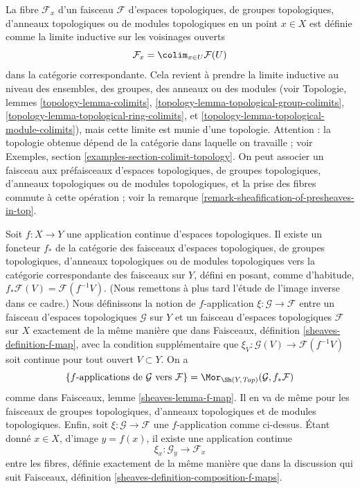 \medskip\noindent
La fibre $\mathcal{F}_x$ d'un faisceau $\mathcal{F}$
d'espaces topologiques, de groupes topologiques, d'anneaux topologiques ou de
modules topologiques en un point $x \in X$ est définie comme la limite inductive sur les
voisinages ouverts
$$
\mathcal{F}_x = \colim_{x\in U} \mathcal{F}(U)
$$
dans la catégorie correspondante. Cela revient à prendre
la limite inductive au niveau des ensembles, des groupes, des anneaux ou des modules
(voir Topologie, lemmes \ref{topology-lemma-colimits},
\ref{topology-lemma-topological-group-colimits},
\ref{topology-lemma-topological-ring-colimits}, et
\ref{topology-lemma-topological-module-colimits}),
mais cette limite est munie d'une topologie. Attention :
la topologie obtenue dépend de la catégorie dans laquelle on travaille ; voir
Exemples, section \ref{examples-section-colimit-topology}.
On peut associer un faisceau aux préfaisceaux d'espaces topologiques,
de groupes topologiques, d'anneaux topologiques ou de modules topologiques,
et la prise des fibres commute à cette opération ; voir
la remarque \ref{remark-sheafification-of-presheaves-in-top}.

\medskip\noindent
Soit $f : X \to Y$ une application continue d'espaces topologiques.
Il existe un foncteur $f_*$ de la catégorie des faisceaux d'espaces
topologiques, de groupes topologiques, d'anneaux topologiques ou de modules topologiques
vers la catégorie correspondante des faisceaux sur $Y$, défini en posant, comme d'habitude,
$f_*\mathcal{F}(V) = \mathcal{F}(f^{-1}V)$.
(Nous remettons à plus tard l'étude de l'image inverse dans ce cadre.)
Nous définissons la notion de $f$-application $\xi : \mathcal{G} \to \mathcal{F}$
entre un faisceau d'espaces topologiques $\mathcal{G}$ sur $Y$ et
un faisceau d'espaces topologiques $\mathcal{F}$ sur $X$ exactement de la
même manière que dans Faisceaux, définition \ref{sheaves-definition-f-map},
avec la condition supplémentaire que
$\xi_V : \mathcal{G}(V) \to \mathcal{F}(f^{-1}V)$ soit continue
pour tout ouvert $V \subset Y$. On a
$$
\{f\text{-applications de }\mathcal{G}\text{ vers }\mathcal{F}\} =
\Mor_{\Sh(Y, \textit{Top})}(\mathcal{G}, f_*\mathcal{F})
$$
comme dans Faisceaux, lemme \ref{sheaves-lemma-f-map}. Il en va de même pour les
faisceaux de groupes topologiques, d'anneaux topologiques et de modules topologiques. Enfin,
soit $\xi : \mathcal{G} \to \mathcal{F}$ une $f$-application comme ci-dessus.
Étant donné $x \in X$, d'image $y = f(x)$, il existe une application
continue
$$
\xi_x : \mathcal{G}_y \longrightarrow \mathcal{F}_x
$$
entre les fibres, définie exactement de la même manière que dans la discussion
qui suit Faisceaux, définition \ref{sheaves-definition-composition-f-maps}.


